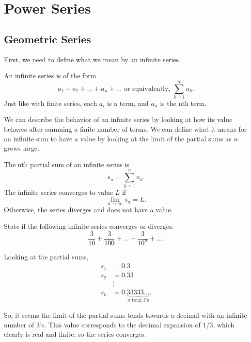 \section{Power Series}
\subsection{Geometric Series}
First, we need to define what we mean by an infinite series.
\begin{definition}
	An infinite series is of the form
	\begin{equation*}
		a_1 + a_2 + \ldots + a_n + \ldots \text{ or equivalently, } \sum_{k=1}^{\infty}{a_k}.
	\end{equation*}
	Just like with finite series, each $a_i$ is a term, and $a_n$ is the nth term.
\end{definition}

We can describe the behavior of an infinite series by looking at how its value behaves after summing a finite number of terms.
We can define what it means for an infinite sum to have a value by looking at the limit of the partial sums as $n$ grows large.
\begin{definition}
	The nth partial sum of an infinite series is
	\begin{equation*}
		s_n = \sum_{k=1}^{n}{a_k}.
	\end{equation*}
	The infinite series converges to value $L$ if
	\begin{equation*}
		\lim_{n\to\infty}{s_n} = L.
	\end{equation*}
	Otherwise, the series diverges and does not have a value.
\end{definition}

\begin{example}
	State if the following infinite series converges or diverges.
	\begin{equation*}
		\frac{3}{10} + \frac{3}{100} + \ldots + \frac{3}{10^n} + \ldots.
	\end{equation*}
\end{example}
\begin{answer}
	Looking at the partial sums,
	\begin{align*}
		s_1 &= 0.3 \\
		s_2 &= 0.33 \\
		&\vdots \\
		s_n &= 0.\underbrace{33333\ldots}_{\text{$n$ total 3's}}.
	\end{align*}
	
	So, it seems the limit of the partial sums tends towards a decimal with an infinite number of 3's.
	This value corresponds to the decimal expansion of 1/3, which clearly is real and finite, so the series converges.
\end{answer}


